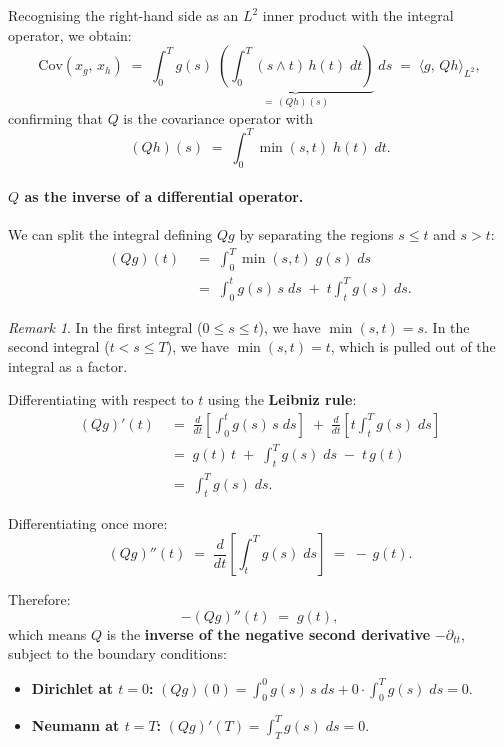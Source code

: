 \documentclass[11pt]{article}
\theoremstyle{definition}
\theoremstyle{remark}
\newtheorem{remark}{Remark}
\begin{document}
Recognising the right-hand side as an $L^2$ inner product
with the integral operator, we obtain:
\[
    \mathrm{Cov}(x_g,\, x_h)
    \;=\;
    \int_0^T
    g(s)\;\underbrace{\left(\int_0^T (s \wedge t)\,h(t)\;dt\right)}_{=\,(Qh)(s)}\;ds
    \;=\;
    \langle g,\, Qh \rangle_{L^2},
\]
confirming that $Q$ is the covariance operator with
\[
    (Qh)(s)
    \;=\;
    \int_0^T \min(s,t)\;h(t)\;dt.
\]

\paragraph{$Q$ as the inverse of a differential operator.}

We can split the integral defining $Qg$ by separating the regions
$s \le t$ and $s > t$:
\begin{align*}
    (Qg)(t)
    &\;=\;
    \int_0^T \min(s,t)\;g(s)\;ds \\[6pt]
    &\;=\;
    \int_0^t g(s)\,s\;ds
    \;+\;
    t\!\int_t^T g(s)\;ds.
\end{align*}

\begin{remark}
In the first integral ($0 \le s \le t$), we have $\min(s,t) = s$.
In the second integral ($t < s \le T$), we have $\min(s,t) = t$,
which is pulled out of the integral as a factor.
\end{remark}

Differentiating with respect to $t$ using the \textbf{Leibniz rule}:
\begin{align*}
    (Qg)'(t)
    &\;=\;
    \frac{d}{dt}\!\left[\int_0^t g(s)\,s\;ds\right]
    \;+\;
    \frac{d}{dt}\!\left[t\!\int_t^T g(s)\;ds\right] \\[6pt]
    &\;=\;
    g(t)\,t
    \;+\;
    \int_t^T g(s)\;ds
    \;-\; t\,g(t) \\[6pt]
    &\;=\;
    \int_t^T g(s)\;ds.
\end{align*}

Differentiating once more:
\[
    (Qg)''(t)
    \;=\;
    \frac{d}{dt}\!\left[\int_t^T g(s)\;ds\right]
    \;=\;
    -\,g(t).
\]

Therefore:
\[
    \boxed{-(Qg)''(t) \;=\; g(t),}
\]
which means $Q$ is the \textbf{inverse of the negative second derivative}
$-\partial_{tt}$, subject to the boundary conditions:
\begin{itemize}
    \item \textbf{Dirichlet at $t = 0$:}\quad
          $(Qg)(0)
          = \int_0^0 g(s)\,s\;ds + 0 \cdot \int_0^T g(s)\;ds
          = 0$.
    \item \textbf{Neumann at $t = T$:}\quad
          $(Qg)'(T)
          = \int_T^T g(s)\;ds
          = 0$.
\end{itemize}
\end{document}
